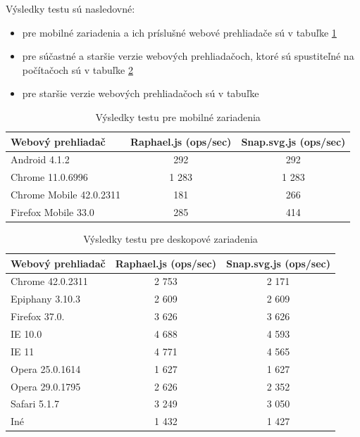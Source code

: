 Výsledky testu sú nasledovné: 
\begin{itemize}
\item pre mobilné zariadenia a ich príslušné webové prehliadače sú v tabuľke \ref{tab:mobily}
\item pre súčastné a staršie verzie webových prehliadačoch, ktoré sú spustiteľné na počítačoch sú v tabuľke \ref{tab:pocitace}
\item pre staršie verzie webových prehliadačoch sú v tabuľke %
\end{itemize}



\begin{table}[H]
	
\begin{center}

\begin{tabular}{|l|c|c|}
	\hline \textbf{Webový prehliadač} & \textbf{Raphael.js (ops/sec)} & \textbf{Snap.svg.js (ops/sec)} \\ 
	\hline Android 4.1.2 & 292 & 292 \\ 
	\hline Chrome 11.0.6996 & 1 283 & 1 283 \\ 
	\hline Chrome Mobile 42.0.2311 & 181 & 266 \\ 
	\hline Firefox Mobile 33.0 & 285 & 414 \\ 
	\hline 
\end{tabular} 
\end{center}

\caption{Výsledky testu pre mobilné zariadenia}
\label{tab:mobily}
	\end{table}

\begin{table}[H]
\begin{center}
		\begin{tabular}{|l|c|c|}
		\hline \textbf{Webový prehliadač} & \textbf{Raphael.js (ops/sec)} & \textbf{Snap.svg.js (ops/sec)} \\ 
		\hline Chrome 42.0.2311 & 2 753 & 2 171 \\ 
		\hline Epiphany 3.10.3 & 2 609 & 2 609 \\ 
		\hline Firefox 37.0. & 3 626 & 3 626 \\ 
	
			\hline IE 10.0 & 4 688 & 4 593 \\ 
			\hline IE 11 & 4 771 & 4 565 \\ 
			\hline Opera 25.0.1614 & 1 627 & 1 627 \\ 
			\hline Opera 29.0.1795 & 2 626 & 2 352 \\ 
			\hline Safari 5.1.7 & 3 249 & 3 050 \\ 
			\hline Iné & 1 432 & 1 427 \\ 
			\hline 
	
	\end{tabular} 
	
\end{center}
	\caption{Výsledky testu pre deskopové zariadenia}
	\label{tab:pocitace}
\end{table}

